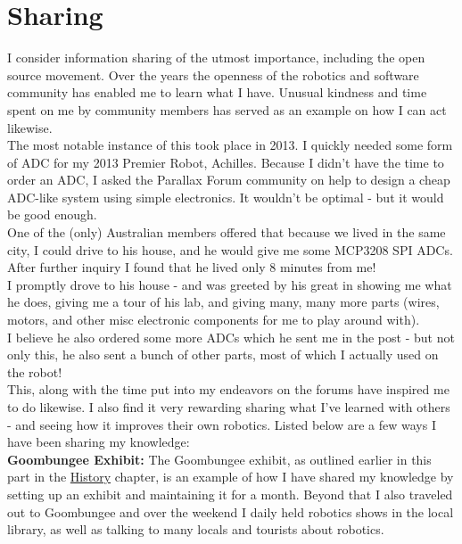 \chapter{Sharing}
	\label{chap:Sharing}

  I consider information sharing of the utmost importance, including the open source movement. Over the years the openness of the robotics and software community has enabled me to learn what I have. Unusual kindness and time spent on me by community members has served as an example on how I can act likewise.\\

  The most notable instance of this took place in 2013. I quickly needed some form of ADC for my 2013 Premier Robot, Achilles. Because I didn't have the time to order an ADC, I asked the Parallax Forum community on help to design a cheap ADC-like system using simple electronics. It wouldn't be optimal - but it would be good enough.\\

  One of the (only) Australian members offered that because we lived in the same city, I could drive to his house, and he would give me some MCP3208 SPI ADCs. After further inquiry I found that he lived only 8 minutes from me!\\

  I promptly drove to his house - and was greeted by his great  in showing me what he does, giving me a tour of his lab, and giving many, many more parts (wires, motors, and other misc electronic components for me to play around with).\\

  I believe he also ordered some more ADCs which he sent me in the post - but not only this, he also sent a bunch of other parts, most of which I actually used on the robot!\\

  This, along with the time put into my endeavors on the forums have inspired me to do likewise. I also find it very rewarding sharing what I've learned with others - and seeing how it improves their own robotics. Listed below are a few ways I have been sharing my knowledge:\\
  
  \textbf{Goombungee Exhibit:} The Goombungee exhibit, as outlined earlier in this part in the \hyperref[chap:History]{History} chapter, is an example of how I have shared my knowledge by setting up an exhibit and maintaining it for a month. Beyond that I also traveled out to Goombungee and over the weekend I daily held robotics shows in the local library, as well as talking to many locals and tourists about robotics.\\
  
